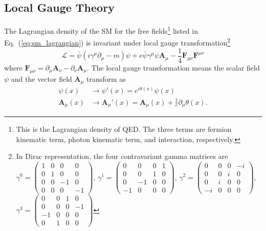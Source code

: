\subsection{Local Gauge Theory}
\label{subsec:sm_gauge_theory}
The Lagrangian density of the SM for the free fields\footnote{This is the Lagrangian density of QED. The three terms are fermion kinematic term, photon kinematic term, and interaction, respectively.} listed in Eq.~(\ref{eq:sm_lagrangian}) is invariant under local gauge transformation\footnote{In Dirac representation, the four contravariant gamma matrices are $\gamma^{0} = \left(\begin{matrix}1 & 0 & 0 & 0\\0 & 1 & 0 & 0\\0 & 0 & -1 & 0\\0 & 0 & 0 & -1\end{matrix}\right)$, $\gamma^{1} = \left(\begin{matrix}0 & 0 & 0 & 1\\0 & 0 & 1 & 0\\0 & -1 & 0 & 0\\-1 & 0 & 0 & 0\end{matrix}\right)$, $\gamma^{2} = \left(\begin{matrix}0 & 0 & 0 & -i\\0 & 0 & i & 0\\0 & i & 0 & 0\\-i & 0 & 0 & 0\end{matrix}\right)$, $\gamma^{3} = \left(\begin{matrix}0 & 0 & 1 & 0\\0 & 0 & 0 & -1\\-1 & 0 & 0 & 0\\0 & 1 & 0 & 0\end{matrix}\right)$}
%
\begin{equation}
    \mathcal{L} = \bar{\psi}(i\gamma^{\mu}\partial_{\mu} - m)\psi + e\bar{\psi}\gamma^{\mu}\psi\bm{A}_{\mu} - \frac{1}{4}\bm{F}_{\mu\nu}\bm{F}^{\mu\nu}
    \label{eq:sm_lagrangian}
\end{equation}
%
where $\bm{F}_{\mu\nu} = \partial_{\mu}\bm{A}_{\nu} - \partial_{\nu}\bm{A}_{\mu}$.
The local gauge transformation means the scalar field $\psi$ and the vector field $\bm{A}_{\mu}$ transform as
%
\begin{align}
    \psi(x) & \rightarrow \psi'(x) = e^{i\theta(x)}\psi(x)\\
    \bm{A}_{\mu}(x) & \rightarrow \bm{A}_{\mu}'(x) = \bm{A}_{\mu}(x) + \frac{1}{e}\partial_{\mu}\theta(x).
    \label{eq:sm_gauge_transformation}
\end{align}
